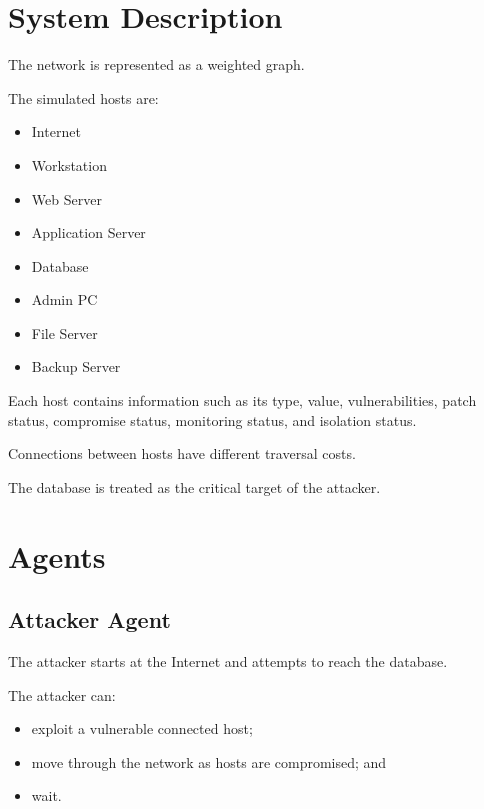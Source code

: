 \documentclass[12pt,a4paper]{article}
\begin{document}
\section{System Description}

The network is represented as a weighted graph.

The simulated hosts are:

\begin{itemize}
    \item Internet
    \item Workstation
    \item Web Server
    \item Application Server
    \item Database
    \item Admin PC
    \item File Server
    \item Backup Server
\end{itemize}

Each host contains information such as its type, value, vulnerabilities,
patch status, compromise status, monitoring status, and isolation status.

Connections between hosts have different traversal costs.

The database is treated as the critical target of the attacker.


\section{Agents}

\subsection{Attacker Agent}

The attacker starts at the Internet and attempts to reach the database.

The attacker can:

\begin{itemize}
    \item exploit a vulnerable connected host;
    \item move through the network as hosts are compromised; and
    \item wait.
\end{itemize}
\end{document}
